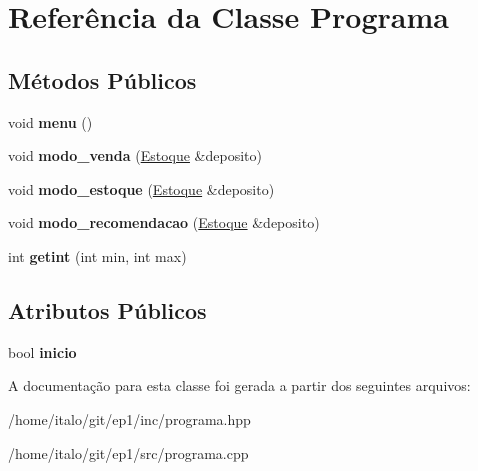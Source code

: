 \hypertarget{class_programa}{}\section{Referência da Classe Programa}
\label{class_programa}
\subsection*{Métodos Públicos}
\begin{DoxyCompactItemize}
\item 
\mbox{\label{class_programa_a96d5ec8d3b1958e2178b3c5e0bf27510}} 
void {\bfseries menu} ()
\item 
\mbox{\label{class_programa_a708b886d24165437c2087477798abd9e}} 
void {\bfseries modo\+\_\+venda} (\hyperlink{class_estoque}{Estoque} \&deposito)
\item 
\mbox{\label{class_programa_ac07912eab019ffdb72cd717fcdec70fd}} 
void {\bfseries modo\+\_\+estoque} (\hyperlink{class_estoque}{Estoque} \&deposito)
\item 
\mbox{\label{class_programa_ad4de5d75ac95046986bb0844d7fd8058}} 
void {\bfseries modo\+\_\+recomendacao} (\hyperlink{class_estoque}{Estoque} \&deposito)
\item 
\mbox{\label{class_programa_a81a3c64a8b3daf015ae6f956f6eeef25}} 
int {\bfseries getint} (int min, int max)
\end{DoxyCompactItemize}
\subsection*{Atributos Públicos}
\begin{DoxyCompactItemize}
\item 
\mbox{\label{class_programa_ab49f082c3dd56de70b50cd8b1acc7bc1}} 
bool {\bfseries inicio}
\end{DoxyCompactItemize}


A documentação para esta classe foi gerada a partir dos seguintes arquivos\+:\begin{DoxyCompactItemize}
\item 
/home/italo/git/ep1/inc/programa.\+hpp\item 
/home/italo/git/ep1/src/programa.\+cpp\end{DoxyCompactItemize}
